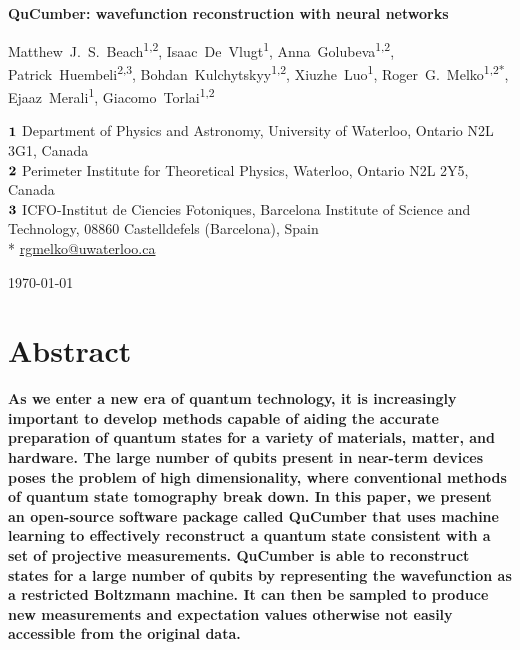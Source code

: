 \documentclass[submission, Phys, hidelnks]{SciPost}
\begin{document}
\begin{center}{\Large \textbf{
    QuCumber: wavefunction reconstruction with neural networks
}}\end{center}

\begin{center}
    Matthew~J.~S.~Beach\textsuperscript{1,2},
    Isaac~De~Vlugt\textsuperscript{1},
    Anna~Golubeva\textsuperscript{1,2},
    Patrick~Huembeli\textsuperscript{2,3},
    Bohdan~Kulchytskyy\textsuperscript{1,2},
    Xiuzhe~Luo\textsuperscript{1},
    Roger~G.~Melko\textsuperscript{1,2*},
    Ejaaz~Merali\textsuperscript{1},
    Giacomo~Torlai\textsuperscript{1,2}
\end{center}

\begin{center}
    ${\bf 1}$ Department of Physics and Astronomy, University of Waterloo,
    Ontario N2L 3G1, Canada
    \\
    ${\bf 2}$ Perimeter Institute for Theoretical Physics, Waterloo,
    Ontario N2L 2Y5, Canada
    \\
    ${\bf 3}$ ICFO-Institut de Ciencies Fotoniques, Barcelona Institute of Science and Technology,
    08860 Castelldefels (Barcelona), Spain\\

    * \href{mailto:rgmelko@uwaterloo.ca}{rgmelko@uwaterloo.ca} \\
\end{center}

\begin{center}
    \today
\end{center}


\section*{Abstract}
{\bf
As we enter a new era of quantum technology, it is increasingly important to develop methods capable of aiding 
the accurate preparation of quantum states for a variety of materials, matter, and hardware.
The large number of qubits present in near-term devices poses the problem of high dimensionality, where conventional methods of quantum state tomography break down. 
        In this paper, we present an open-source software package called QuCumber that uses machine learning to effectively reconstruct a quantum state consistent with a set of projective measurements. 
        QuCumber is able to reconstruct states for a large number of qubits by representing the wavefunction as a restricted Boltzmann machine.
It can then be sampled to produce new measurements and expectation values otherwise not easily accessible from the original data.
}
\end{document}
